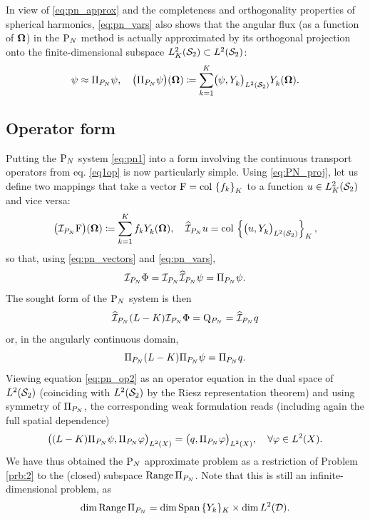 In view of \eqref{eq:pn_approx} and the completeness and orthogonality properties of spherical harmonics,
\eqref{eq:pn_vars} also shows that the angular flux (as a function of $\bomega$) in the $\PN$ method is actually
approximated by its orthogonal projection onto the finite-dimensional subspace $\Lp[2]_K(\Sphere)\subset\Lp[2](\Sphere)$:
\begin{equation}\label{eq:PN_proj}
	\psi \approx \Projop\psi, \quad \bigl(\Projop\psi\bigr)(\bomega) \coloneqq \sum_{k=1}^{ K}\ipsl{\psi}{\Y{k}{}}
	\Y{k}{}(\bomega).
\end{equation}

\subsection{Operator form} \label{sec:pn_op}
Putting the $\PN$ system \eqref{eq:pn1} into a form involving the continuous transport operators
from eq. \eqref{eq1op}
is now particularly simple.
Using \eqref{eq:PN_proj}, let us define two mappings that take a vector $\mathrm{F} = \colset{f_k}{K}$ to a
function \mbox{$u\in\Lp[2]_K(\Sphere)$} and vice versa:%
\begin{equation}\label{eq:pn_op_def}
\bigl(\PiPN\mathrm{F}\bigr)(\bomega) \coloneqq \sum_{k=1}^{ K} f_k\Y{k}{}(\bomega), \quad
\PihPN u = \col \left\{\bigl(u, \Y{k}{}\bigr)_{\Lp[2](\Sphere)}\right\}_{\idxset{K}},
\end{equation} 
so that, using \eqref{eq:pn_vectors} and \eqref{eq:pn_vars},
$$
\PiPN\Phi = \PiPN\PihPN \psi = \Projop\psi.
$$ 
% 
The sought form of the $\PN$ system is then
\begin{equation}\label{eq:pn_op}
	\PihPN (L-K) \PiPN\Phi = \mathrm{Q}_{P_N} = \PihPN q
\end{equation}
or, in the angularly continuous domain,
\begin{equation}\label{eq:pn_op2}
	\Projop (L-K) \Projop\psi = \Projop q.
\end{equation}
Viewing equation \eqref{eq:pn_op2} as an operator equation in the dual space of $\Lp[2](\Sphere)$ (coinciding
with $\Lp[2](\Sphere)$ by the Riesz representation theorem) and using symmetry of $\Projop$, the corresponding weak
formulation reads (including again the full spatial dependence)
\begin{equation}\label{eq:pn_weak}
	\bigl( (L-K)\Projop\psi, \Projop\varphi\bigr)_{\Lp[2](X)} = \bigl( q, \Projop\varphi\bigr)_{\Lp[2](X)},\quad
	\forall\varphi\in\Lp[2](X).
\end{equation}
We have thus obtained the $\PN$ approximate problem as a restriction of Problem \ref{prb:2} to the (closed) subspace
$\Rng\Projop$. Note that this is still an infinite-dimensional problem, as 
$$
	\dim \Rng\Projop = \dim \text{Span}\,\{Y_k\}_K \times \dim \Lp[2](\VV).
$$
